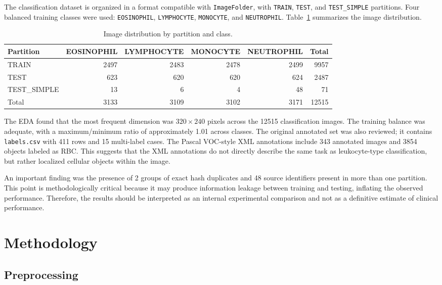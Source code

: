 \documentclass[11pt,a4paper]{article}
\begin{document}
The classification dataset is organized in a format compatible with \texttt{ImageFolder}, with \texttt{TRAIN}, \texttt{TEST}, and \texttt{TEST\_SIMPLE} partitions. Four balanced training classes were used: \texttt{EOSINOPHIL}, \texttt{LYMPHOCYTE}, \texttt{MONOCYTE}, and \texttt{NEUTROPHIL}. Table~\ref{tab:distribucion} summarizes the image distribution.

\begin{table}[H]
\centering
\caption{Image distribution by partition and class.}
\label{tab:distribucion}
\begin{tabular}{lrrrrr}
\toprule
Partition & EOSINOPHIL & LYMPHOCYTE & MONOCYTE & NEUTROPHIL & Total \\
\midrule
TRAIN & 2497 & 2483 & 2478 & 2499 & 9957 \\
TEST & 623 & 620 & 620 & 624 & 2487 \\
TEST\_SIMPLE & 13 & 6 & 4 & 48 & 71 \\
\midrule
Total & 3133 & 3109 & 3102 & 3171 & 12515 \\
\bottomrule
\end{tabular}
\end{table}

The EDA found that the most frequent dimension was $320 \times 240$ pixels across the 12515 classification images. The training balance was adequate, with a maximum/minimum ratio of approximately 1.01 across classes. The original annotated set was also reviewed; it contains \texttt{labels.csv} with 411 rows and 15 multi-label cases. The Pascal VOC-style XML annotations include 343 annotated images and 3854 objects labeled as RBC. This suggests that the XML annotations do not directly describe the same task as leukocyte-type classification, but rather localized cellular objects within the image.

An important finding was the presence of 2 groups of exact hash duplicates and 48 source identifiers present in more than one partition. This point is methodologically critical because it may produce information leakage between training and testing, inflating the observed performance. Therefore, the results should be interpreted as an internal experimental comparison and not as a definitive estimate of clinical performance.

\section{Methodology}

\subsection{Preprocessing}
\end{document}
